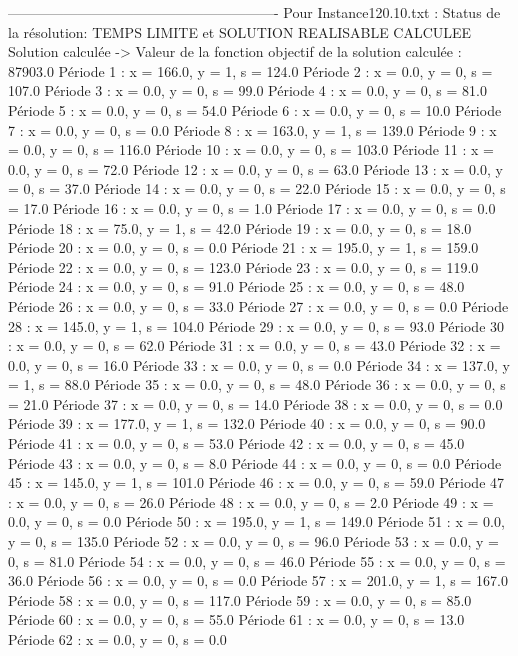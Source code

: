 ----------------------------------------------------------
Pour Instance120.10.txt :
Status de la résolution: TEMPS LIMITE et SOLUTION REALISABLE CALCULEE
Solution calculée
-> Valeur de la fonction objectif de la solution calculée :  87903.0
Période 1 : x = 166.0, y = 1, s = 124.0
Période 2 : x = 0.0, y = 0, s = 107.0
Période 3 : x = 0.0, y = 0, s = 99.0
Période 4 : x = 0.0, y = 0, s = 81.0
Période 5 : x = 0.0, y = 0, s = 54.0
Période 6 : x = 0.0, y = 0, s = 10.0
Période 7 : x = 0.0, y = 0, s = 0.0
Période 8 : x = 163.0, y = 1, s = 139.0
Période 9 : x = 0.0, y = 0, s = 116.0
Période 10 : x = 0.0, y = 0, s = 103.0
Période 11 : x = 0.0, y = 0, s = 72.0
Période 12 : x = 0.0, y = 0, s = 63.0
Période 13 : x = 0.0, y = 0, s = 37.0
Période 14 : x = 0.0, y = 0, s = 22.0
Période 15 : x = 0.0, y = 0, s = 17.0
Période 16 : x = 0.0, y = 0, s = 1.0
Période 17 : x = 0.0, y = 0, s = 0.0
Période 18 : x = 75.0, y = 1, s = 42.0
Période 19 : x = 0.0, y = 0, s = 18.0
Période 20 : x = 0.0, y = 0, s = 0.0
Période 21 : x = 195.0, y = 1, s = 159.0
Période 22 : x = 0.0, y = 0, s = 123.0
Période 23 : x = 0.0, y = 0, s = 119.0
Période 24 : x = 0.0, y = 0, s = 91.0
Période 25 : x = 0.0, y = 0, s = 48.0
Période 26 : x = 0.0, y = 0, s = 33.0
Période 27 : x = 0.0, y = 0, s = 0.0
Période 28 : x = 145.0, y = 1, s = 104.0
Période 29 : x = 0.0, y = 0, s = 93.0
Période 30 : x = 0.0, y = 0, s = 62.0
Période 31 : x = 0.0, y = 0, s = 43.0
Période 32 : x = 0.0, y = 0, s = 16.0
Période 33 : x = 0.0, y = 0, s = 0.0
Période 34 : x = 137.0, y = 1, s = 88.0
Période 35 : x = 0.0, y = 0, s = 48.0
Période 36 : x = 0.0, y = 0, s = 21.0
Période 37 : x = 0.0, y = 0, s = 14.0
Période 38 : x = 0.0, y = 0, s = 0.0
Période 39 : x = 177.0, y = 1, s = 132.0
Période 40 : x = 0.0, y = 0, s = 90.0
Période 41 : x = 0.0, y = 0, s = 53.0
Période 42 : x = 0.0, y = 0, s = 45.0
Période 43 : x = 0.0, y = 0, s = 8.0
Période 44 : x = 0.0, y = 0, s = 0.0
Période 45 : x = 145.0, y = 1, s = 101.0
Période 46 : x = 0.0, y = 0, s = 59.0
Période 47 : x = 0.0, y = 0, s = 26.0
Période 48 : x = 0.0, y = 0, s = 2.0
Période 49 : x = 0.0, y = 0, s = 0.0
Période 50 : x = 195.0, y = 1, s = 149.0
Période 51 : x = 0.0, y = 0, s = 135.0
Période 52 : x = 0.0, y = 0, s = 96.0
Période 53 : x = 0.0, y = 0, s = 81.0
Période 54 : x = 0.0, y = 0, s = 46.0
Période 55 : x = 0.0, y = 0, s = 36.0
Période 56 : x = 0.0, y = 0, s = 0.0
Période 57 : x = 201.0, y = 1, s = 167.0
Période 58 : x = 0.0, y = 0, s = 117.0
Période 59 : x = 0.0, y = 0, s = 85.0
Période 60 : x = 0.0, y = 0, s = 55.0
Période 61 : x = 0.0, y = 0, s = 13.0
Période 62 : x = 0.0, y = 0, s = 0.0
